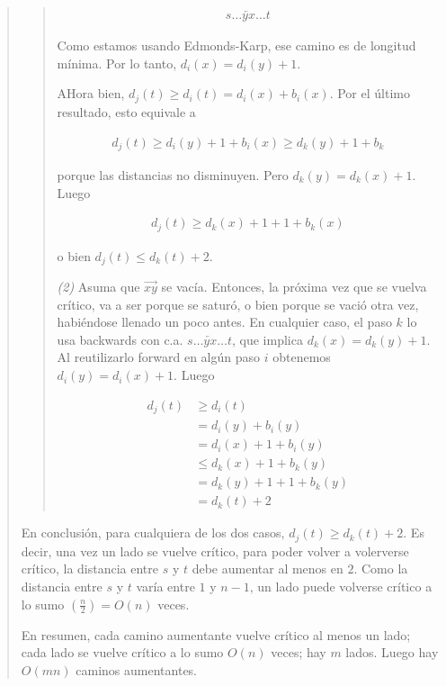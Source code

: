 \documentclass[a4paper]{article}
\begin{document}
\begin{quote}
\begin{quote}
    \begin{align*}
        s \ldots \overleftarrow{yx} \ldots t
    \end{align*}

    Como estamos usando Edmonds-Karp, ese camino es de longitud mínima. Por lo
    tanto, $d_i(x) = d_i(y) + 1$. 

    AHora bien, $d_j(t) \geq d_i(t) = d_i(x) + b_i(x)$. Por el último resultado, esto equivale a 

    \begin{align*}
        d_j(t) \geq d_i(y) + 1 + b_i(x) \geq d_k(y) + 1 + b_k
    \end{align*}

    porque las distancias no disminuyen. Pero $d_k(y) = d_k(x) + 1$. Luego 

    \begin{align*}
        d_j(t) \geq d_k(x) + 1 + 1 + b_k(x) 
    \end{align*}

    o bien $d_j(t) \leq d_k(t) + 2$.


    \textit{(2)} Asuma que $\overrightarrow{xy}$ se vacía. Entonces, la próxima
    vez que se vuelva crítico, va a ser porque se saturó, o bien porque se
    vació otra vez, habiéndose llenado un poco antes. En cualquier caso, el
    paso $k$ lo usa backwards con c.a. $s \ldots \overleftarrow{yx} \ldots t$,
    que implica $d_{k}(x) = d_k(y) + 1$. Al reutilizarlo forward en algún paso
    $i$ obtenemos $d_i(y) = d_i(x) + 1$. Luego 

    \begin{align*}
        d_j(t) &\geq d_i(t)  \\ 
               &=d_i(y) + b_i(y) \\ 
               &= d_i(x) + 1 + b_i(y) \\ 
               &\leq d_k(x) + 1 + b_k(y) \\ 
               &= d_k(y) + 1 + 1 + b_k(y) \\ 
               &=d_k(t) + 2
    \end{align*}
    
\end{quote}

En conclusión, para cualquiera de los dos casos, $d_j(t) \geq d_k(t) + 2$. Es
decir, una vez un lado se vuelve crítico, para poder volver a volerverse
crítico, la distancia entre $s$ y $t$ debe aumentar al menos en $2$. Como la
distancia entre $s$ y $t$ varía entre $1$ y $n - 1$, un lado puede volverse
crítico a lo sumo $(\frac{n}{2}) = O(n)$ veces.

En resumen, cada camino aumentante vuelve crítico al menos un lado; cada lado
se vuelve crítico a lo sumo $O(n)$ veces; hay $m$ lados. Luego hay $O(mn)$
caminos aumentantes.

\end{quote}
\normalsize
\end{document}
